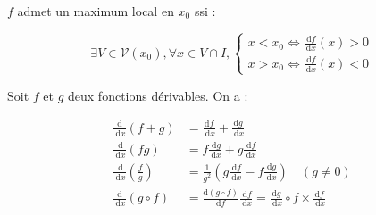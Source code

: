 $f$ admet un maximum local en $x_0$ ssi :

$$
\exists V \in \mathcal{V}\left(x_0\right), \forall x \in V \cap I,\left\{\begin{array}{l}
x<x_0 \Longleftrightarrow \frac{\mathrm{~d} f}{\mathrm{~d} x}(x)>0 \\
x>x_0 \Longleftrightarrow \frac{\mathrm{~d} f}{\mathrm{~d} x}(x)<0
\end{array}\right.
$$

Soit $f$ et $g$ deux fonctions dérivables. On a :

$$
\begin{aligned}
\frac{\mathrm{d}}{\mathrm{~d} x}(f+g) & =\frac{\mathrm{d} f}{\mathrm{~d} x}+\frac{\mathrm{d} g}{\mathrm{~d} x} \\
\frac{\mathrm{~d}}{\mathrm{~d} x}(f g) & =f \frac{\mathrm{~d} g}{\mathrm{~d} x}+g \frac{\mathrm{~d} f}{\mathrm{~d} x} \\
\frac{\mathrm{~d}}{\mathrm{~d} x}\left(\frac{f}{g}\right) & =\frac{1}{g^2}\left(g \frac{\mathrm{~d} f}{\mathrm{~d} x}-f \frac{\mathrm{~d} g}{\mathrm{~d} x}\right) \quad(g \neq 0) \\
\frac{\mathrm{d}}{\mathrm{~d} x}(g \circ f) & =\frac{\mathrm{d}(g \circ f)}{\mathrm{d} f} \frac{\mathrm{~d} f}{\mathrm{~d} x}=\frac{\mathrm{d} g}{\mathrm{~d} x} \circ f \times \frac{\mathrm{d} f}{\mathrm{~d} x}
\end{aligned}
$$



